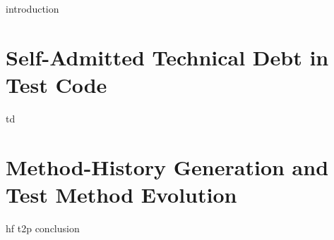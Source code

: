 \documentclass[12pt,oneside]{report}
\begin{document}

\clearpage

\setcounter{page}{2}

\clearpage

\clearpage

\clearpage

\clearpage

{}
\tableofcontents
\clearpage

\cleardoublepage
{}
{}
\listoftables

\cleardoublepage
{}
{}
\listoffigures

\cleardoublepage

\setcounter{page}{1}

{introduction}
\part{Self-Admitted Technical Debt in Test Code}
\label{part:technical-debt}
{td}
\part{Method-History Generation and Test Method Evolution}
\label{part:test-method-evolution}
{hf}
{t2p}
{conclusion}


\cleardoublepage
{}
{}





% 
% 

\clearpage

%
\clearpage
\end{document}

